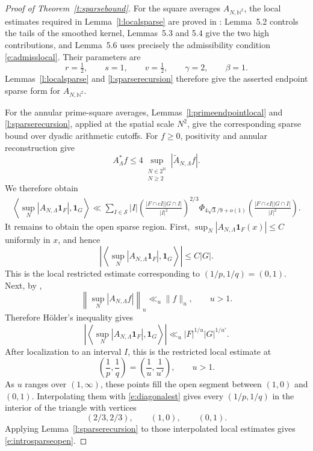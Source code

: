 \documentclass[12pt,reqno]{amsart}
\numberwithin{equation}{section}
\theoremstyle{definition}
\theoremstyle{remark}
\begin{document}
\begin{proof}[Proof of Theorem~\ref{t:sparsebound}]
For the square averages $A_{N,\mathbb N^2}$, the local estimates required
in Lemma~\ref{l:localsparse} are proved in
\cite[Lemmas~5.2--5.6]{LHF}: Lemma~5.2 controls the tails of the
smoothed kernel, Lemmas~5.3 and 5.4 give the two high contributions,
and Lemma~5.6 uses precisely the admissibility condition
\eqref{e:admisslocal}.  Their parameters are
\[
 r=\tfrac12,\qquad s=1,\qquad v=\tfrac12,\qquad
 \gamma=2,\qquad\beta=1.
\]
Lemmas~\ref{l:localsparse} and \ref{l:sparserecursion} therefore give
the asserted endpoint sparse form for $A_{N,\mathbb N^2}$.

For the annular prime-square averages,
Lemmas~\ref{l:primeendpointlocal} and \ref{l:sparserecursion},
applied at the spatial scale \(N^2\), give the corresponding
sparse bound over dyadic arithmetic cutoffs.
For $f\geq0$, positivity and annular reconstruction give
\[
 A_\Lambda^*f
 \leq4\sup_{\substack{N\in2^{\mathbb N}\\N\geq2}}
 |\widetilde A_{N,\Lambda}f|.
\]
We therefore obtain
\begin{align}\label{e:diagonalest}
 \left\langle\sup_N|A_{N,\Lambda}\mathbf1_F|,
 \mathbf1_G\right\rangle
 \ll\sum_{I\in\mathcal S}|I|
 \left(\frac{|F\cap cI||G\cap I|}{|I|^2}\right)^{2/3}
 \Phi_{4\sqrt3/9+o(1)}
 \left(\frac{|F\cap cI||G\cap I|}{|I|^2}\right).
\end{align}
It remains to obtain the open sparse region.  First,
\(\sup_N|A_{N,\Lambda}\mathbf1_F(x)|\leq C\) uniformly in \(x\), and
hence
\[
 \left|\left\langle
 \sup_N|A_{N,\Lambda}\mathbf1_F|,\mathbf1_G
 \right\rangle\right|\leq C|G|.
\]
This is the local restricted estimate corresponding to
\((1/p,1/q)=(0,1)\).  Next, by \cite[Theorem~1]{melhop},
\[
 \left\|\sup_N|A_{N,\Lambda}f|\right\|_u
 \ll_u\|f\|_u,\qquad u>1.
\]
Therefore H\"older's inequality gives
\[
 \left|\left\langle
 \sup_N|A_{N,\Lambda}\mathbf1_F|,\mathbf1_G
 \right\rangle\right|
 \ll_u |F|^{1/u}|G|^{1/u'}.
\]
After localization to an interval \(I\), this is the restricted local
estimate at
\[
 \left(\frac1p,\frac1q\right)
 =\left(\frac1u,\frac1{u'}\right),\qquad u>1.
\]
As \(u\) ranges over \((1,\infty)\), these points fill the open segment
between \((1,0)\) and \((0,1)\).  Interpolating them with
\eqref{e:diagonalest} gives every \((1/p,1/q)\) in the interior of the
triangle with vertices
\[
 (2/3,2/3),\qquad(1,0),\qquad(0,1).
\]
Applying Lemma~\ref{l:sparserecursion} to those interpolated local
estimates gives \eqref{e:introsparseopen}.
\end{proof}
\end{document}
